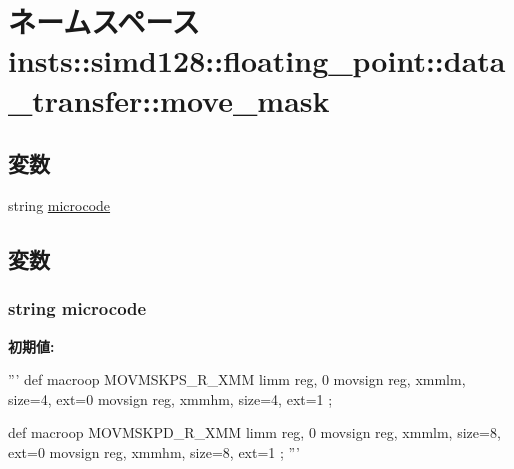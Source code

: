 \hypertarget{namespaceinsts_1_1simd128_1_1floating__point_1_1data__transfer_1_1move__mask}{
\section{ネームスペース insts::simd128::floating\_\-point::data\_\-transfer::move\_\-mask}
\label{namespaceinsts_1_1simd128_1_1floating__point_1_1data__transfer_1_1move__mask}
}
\subsection*{変数}
\begin{DoxyCompactItemize}
\item 
string \hyperlink{namespaceinsts_1_1simd128_1_1floating__point_1_1data__transfer_1_1move__mask_a770f11a173e99389a8802f0107ed8f52}{microcode}
\end{DoxyCompactItemize}


\subsection{変数}
\hypertarget{namespaceinsts_1_1simd128_1_1floating__point_1_1data__transfer_1_1move__mask_a770f11a173e99389a8802f0107ed8f52}{
\subsubsection[{microcode}]{\setlength{\rightskip}{0pt plus 5cm}string {\bf microcode}}}
\label{namespaceinsts_1_1simd128_1_1floating__point_1_1data__transfer_1_1move__mask_a770f11a173e99389a8802f0107ed8f52}
{\bfseries 初期値:}
\begin{DoxyCode}
'''
def macroop MOVMSKPS_R_XMM {
    limm reg, 0
    movsign reg, xmmlm, size=4, ext=0
    movsign reg, xmmhm, size=4, ext=1
};

def macroop MOVMSKPD_R_XMM {
    limm reg, 0
    movsign reg, xmmlm, size=8, ext=0
    movsign reg, xmmhm, size=8, ext=1
};
'''
\end{DoxyCode}
